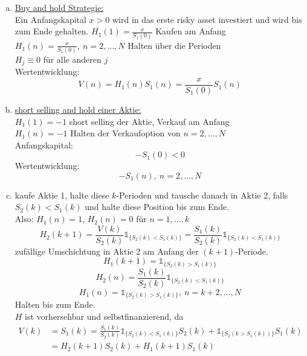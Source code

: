 \begin{enumerate}[(a)]
	\item \uline{Buy and hold Strategie:}\\
	Ein Anfangskapital $x>0$ wird in das erste risky asset investiert und wird bis zum Ende gehalten.
	$H_1(1)=\frac{x}{S_1(0)}$ Kaufen am Anfang\\
	$H_1(n)=\frac{x}{S_1(0)},~n=2,\dots,N$ Halten über die Perioden\\
	$H_j\equiv 0$ für alle anderen $j$\\
	Wertentwicklung:\\
	\[
	V(n)=H_1(n)S_1(n)=\frac{x}{S_1(0)}S_1(n)
	\]
	\item \uline{short selling and hold einer Aktie:}\\
	$H_1(1)=-1$ short selling der Aktie, Verkauf am Anfang\\
	$H_1(n)=-1$ Halten der Verkaufoption von $n=2,\dots,N$\\
	Anfangskapital:
	\[
	-S_1(0)<0
	\]
	Wertentwicklung:
	\[
	-S_1(n),~n=2,\dots,N
	\]
	\newpage
	\item kaufe Aktie 1, halte diese $k$-Perioden und tausche danach in Aktie 2, falls $S_2(k)<S_1(k)$ und halte diese Position bis zum Ende.\\
	Also:
	$H_1(n)=1$, $H_2(n)=0$ für $n=1,\dots,k$\\
	\[
	H_2(k+1)=\frac{V(k)}{S_2(k)}\mathbb{1}_{\{S_2(k)<S_1(k)\}}=\frac{S_1(k)}{S_2(k)}\mathbb{1}_{\{S_2(k)<S_1(k)\}}
	\] 
	zufällige Umschichtung in Aktie 2 am Anfang der $(k+1)$-Periode.\\
	\[
	H_1(k+1)=\mathbb{1}_{\{S_2(k)>S_1(k)\}}
	\]
	\[
	H_2(n)=\frac{S_1(k)}{S_2(k)}\mathbb{1}_{\{S_2(k)<S_1(k)\}}
	\]
	\[
	H_1(n)=\mathbb{1}_{\{S_2(k)>S_1(k)\}},~ n=k+2,\dots,N
	\]
	Halten bis zum Ende.\\
	$H$ ist vorhersehbar und selbstfinanzierend, da 
	\begin{equation*}
	\begin{aligned}
		V(k) &= S_1(k)=\frac{S_1(k)}{S_2(k)}\mathbb{1}_{\{S_2(k)<S_1(k)\}}S_2(k)+\mathbb{1}_{\{S_2(k>S_1(k))\}}S_1(k)\\
		&= H_2(k+1)S_2(k)+H_1(k+1)S_1(k)
	\end{aligned}
	\end{equation*}
\end{enumerate}

